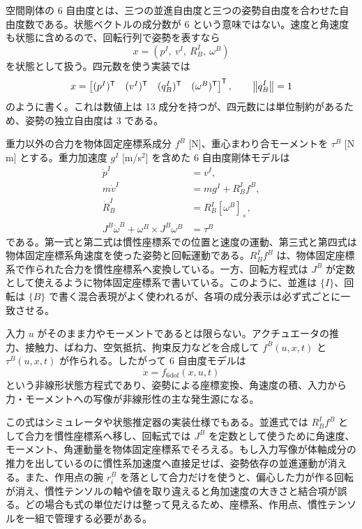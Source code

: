 空間剛体の 6 自由度とは、三つの並進自由度と三つの姿勢自由度を合わせた自由度数である。状態ベクトルの成分数が 6 という意味ではない。速度と角速度も状態に含めるので、回転行列で姿勢を表すなら
\begin{equation}
  x=\left(p^I,\ v^I,\ R^I_B,\ \omega^B\right)
\end{equation}
を状態として扱う。四元数を使う実装では
\begin{equation}
  x=
  \begin{bmatrix}
    (p^I)^{\mathsf{T}}&(v^I)^{\mathsf{T}}&(q^I_B)^{\mathsf{T}}&(\omega^B)^{\mathsf{T}}
  \end{bmatrix}^{\mathsf{T}},
  \qquad
  \left\|q^I_B\right\|=1
\end{equation}
のように書く。これは数値上は 13 成分を持つが、四元数には単位制約があるため、姿勢の独立自由度は 3 である。

重力以外の合力を物体固定座標系成分 $f^B$ [N]、重心まわり合モーメントを $\tau^B$ [N\,m] とする。重力加速度 $g^I$ [m/s$^2$] を含めた 6 自由度剛体モデルは
\begin{align}
  \dot{p}^I&=v^I,\\
  m\dot{v}^I&=mg^I+R^I_B f^B,\\
  \dot{R}^I_B&=R^I_B[\omega^B]_\times,\\
  J^B\dot{\omega}^B+\omega^B\times J^B\omega^B&=\tau^B
  \label{eq:euler-rigid}
\end{align}
である。第一式と第二式は慣性座標系での位置と速度の運動、第三式と第四式は物体固定座標系角速度を使った姿勢と回転運動である。$R^I_B f^B$ は、物体固定座標系で作られた合力を慣性座標系へ変換している。一方、回転方程式は $J^B$ が定数として使えるように物体固定座標系で書いている。このように、並進は $\{I\}$、回転は $\{B\}$ で書く混合表現がよく使われるが、各項の成分表示は必ず式ごとに一致させる。

入力 $u$ がそのまま力やモーメントであるとは限らない。アクチュエータの推力、接触力、ばね力、空気抵抗、拘束反力などを合成して $f^B(u,x,t)$ と $\tau^B(u,x,t)$ が作られる。したがって 6 自由度モデルは
\begin{equation}
  \dot{x}=f_\mathrm{6dof}(x,u,t)
\end{equation}
という非線形状態方程式であり、姿勢による座標変換、角速度の積、入力から力・モーメントへの写像が非線形性の主な発生源になる。

この式はシミュレータや状態推定器の実装仕様でもある。並進式では $R^I_B f^B$ として合力を慣性座標系へ移し、回転式では $J^B$ を定数として使うために角速度、モーメント、角運動量を物体固定座標系でそろえる。もし入力写像が体軸成分の推力を出しているのに慣性系加速度へ直接足せば、姿勢依存の並進運動が消える。また、作用点の腕 $r_i^B$ を落として合力だけを使うと、偏心した力が作る回転が消え、慣性テンソルの軸や値を取り違えると角加速度の大きさと結合項が誤る。どの場合も式の単位だけは整って見えるため、座標系、作用点、慣性テンソルを一組で管理する必要がある。

